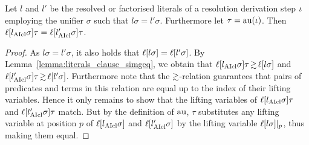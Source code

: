 \documentclass[,%
	draft=false,%
	numbers=noendperiod
	11pt,
	a4paper,
	oneside,%
	openany,
]{memoir}
\begin{document}
\begin{lemma}
	\label{lemma:lifted_literal_equal}
	Let $l$ and $l'$ be the resolved or factorised literals of a resolution derivation step $\iota$ employing the unifier $\sigma$ such that $l\sigma = l'\sigma$.
	Furthermore let $\tau =\nolinebreak \aiu(\inference)$.
	Then $\ell[l_{\operatorname{AIcl}}\sigma]\tau = \ell[l_{\operatorname{AIcl}}'\sigma]\tau$.
\end{lemma}
\begin{proof}
	As
	$l\sigma = l'\sigma$, it also holds that
	$\ell[l\sigma] = \ell[l'\sigma]$.
	By Lemma~\ref{lemma:literals_clause_simgeq}, we obtain that
	$\lifboth{l\cl\sigma}\tau \simgeq \lifboth{l\sigma}$ and
	$\lifboth{l'\cl\sigma}\tau \simgeq \lifboth{l'\sigma}$.
	Furthermore note that the $\simgeq$-\nolinebreak{}relation guarantees that pairs of predicates and terms in this relation are equal up to the index of their lifting variables.
	Hence it only remains to show that the lifting variables of $\ell[l_{\operatorname{AIcl}}\sigma]\tau$ and $\ell[l'_{\operatorname{AIcl}}\sigma]\tau$ match.
	But by the definition of $\operatorname{au}$, $\tau$ substitutes any lifting variable at position $p$ of $\ell[l_{\operatorname{AIcl}}\sigma]$ and $\ell[l'_{\operatorname{AIcl}}\sigma]$ by the lifting variable $\ell[l\sigma]|_{p}$,
	thus making them equal.
\end{proof}
\end{document}
